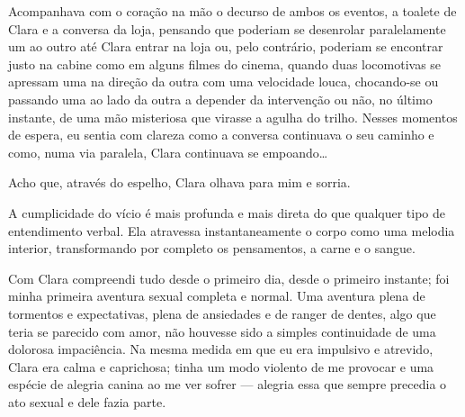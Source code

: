 
Acompanhava com o coração na mão o decurso de ambos os eventos, a toalete de
Clara e a conversa da loja, pensando que poderiam se desenrolar paralelamente
um ao outro até Clara entrar na loja ou, pelo contrário, poderiam se
encontrar justo na cabine como em alguns filmes do cinema, quando duas
locomotivas se apressam uma na direção da outra com uma velocidade louca,
chocando-se ou passando uma ao lado da outra a depender da intervenção ou
não, no último instante, de uma mão misteriosa que virasse a agulha do
trilho. Nesses momentos de espera, eu sentia com clareza como a conversa
continuava o seu caminho e como, numa via paralela, Clara continuava se
empoando\ldots{}


Acho que, através do espelho, Clara olhava para mim e sorria.


A cumplicidade do vício é mais profunda e mais direta do que qualquer tipo de
entendimento verbal. Ela atravessa instantaneamente o corpo como uma melodia
interior, transformando por completo os pensamentos, a carne e o sangue.


Com Clara compreendi tudo desde o primeiro dia, desde o primeiro instante; foi
minha primeira aventura sexual completa e normal. Uma aventura plena de
tormentos e expectativas, plena de ansiedades e de ranger de dentes, algo que
teria se parecido com amor, não houvesse sido a simples continuidade de uma
dolorosa impaciência. Na mesma medida em que eu era impulsivo e atrevido,
Clara era calma e caprichosa; tinha um modo violento de me provocar e uma
espécie de alegria canina ao me ver sofrer --- alegria essa que sempre
precedia o ato sexual e dele fazia parte.

